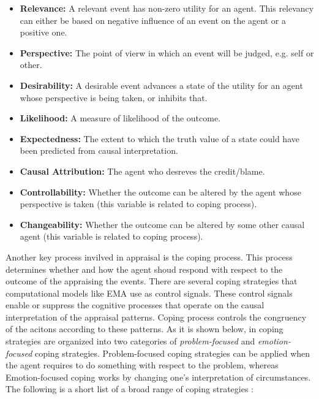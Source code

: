 \documentclass[11pt]{article}
\begin{document}
\begin{itemize}
  \item \textbf{Relevance:} A relevant event has non-zero utility for an agent.
  This relevancy can either be based on negative influence of an event on the
  agent or a positive one.
  
  \item \textbf{Perspective:} The point of vierw in which an event will be
  judged, e.g. self or other.
  
  \item \textbf{Desirability:} A desirable event advances a state of the utility
  for an agent whose perspective is being taken, or inhibits that.
  
  \item \textbf{Likelihood:} A measure of likelihood of the outcome.
  
  \item \textbf{Expectedness:} The extent to which the truth value of a state
  could have been predicted from causal interpretation.
  
  \item \textbf{Causal Attribution:} The agent who desreves the credit/blame.
  
  \item \textbf{Controllability:} Whether the outcome can be altered by the
  agent whose perspective is taken (this variable is related to coping process).
  
  \item \textbf{Changeability:} Whether the outcome can be altered by some other
  causal agent (this variable is related to coping process).
\end{itemize}

Another key process invilved in appraisal is the coping process. This process
determines whether and how the agent shoud respond with respect to the outcome
of the appraising the events. There are several coping strategies that
computational models like EMA \cite{gratch:domain-independent} use as control
signals. These control signals enable or suppress the cognitive processes that
operate on the causal interpretation of the appraisal patterns. Coping process
controls the congruency of the acitons according to these patterns. As it is
shown below, in \cite{gratch:domain-independent} coping strategies are organized
into two categories of \textit{problem-focused} and \textit{emotion-focused}
coping strategies. Problem-focused coping strategies can be applied when the
agent requires to do something with respect to the problem, whereas
Emotion-focused coping works by changing one's interpretation of circumstances.
The following is a short list of a broad range of coping strategies
\cite{gratch:domain-independent}:
\end{document}
